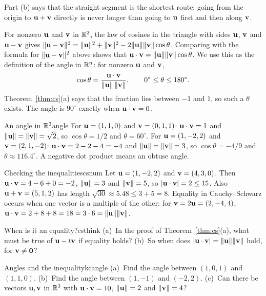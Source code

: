 \documentclass[11pt]{article}
\begin{document}
Part (b) says that the straight segment is the shortest route: going from the origin to $\mathbf{u}+\mathbf{v}$ directly is never longer than going to $\mathbf{u}$ first and then along $\mathbf{v}$.

For nonzero $\mathbf{u}$ and $\mathbf{v}$ in $\mathbb{R}^2$, the law of cosines in the triangle with sides $\mathbf{u}$, $\mathbf{v}$ and $\mathbf{u}-\mathbf{v}$ gives $\lVert\mathbf{u}-\mathbf{v}\rVert^2=\lVert\mathbf{u}\rVert^2+\lVert\mathbf{v}\rVert^2-2\lVert\mathbf{u}\rVert\lVert\mathbf{v}\rVert\cos\theta$. Comparing with the formula for $\lVert\mathbf{u}-\mathbf{v}\rVert^2$ above shows that $\mathbf{u}\cdot\mathbf{v}=\lVert\mathbf{u}\rVert\lVert\mathbf{v}\rVert\cos\theta$. We use this as the definition of the angle in $\mathbb{R}^n$: for nonzero $\mathbf{u}$ and $\mathbf{v}$,
\[
\cos\theta=\frac{\mathbf{u}\cdot\mathbf{v}}{\lVert\mathbf{u}\rVert\,\lVert\mathbf{v}\rVert},\qquad 0^\circ\le\theta\le180^\circ.
\]
Theorem~\ref{thm:cs}(a) says that the fraction lies between $-1$ and $1$, so such a $\theta$ exists. The angle is $90^\circ$ exactly when $\mathbf{u}\cdot\mathbf{v}=0$.

\begin{exmp}{An angle in $\mathbb{R}^3$}{angle}
For $\mathbf{u}=(1,1,0)$ and $\mathbf{v}=(0,1,1)$: $\mathbf{u}\cdot\mathbf{v}=1$ and $\lVert\mathbf{u}\rVert=\lVert\mathbf{v}\rVert=\sqrt2$, so $\cos\theta=1/2$ and $\theta=60^\circ$. For $\mathbf{u}=(1,-2,2)$ and $\mathbf{v}=(2,1,-2)$: $\mathbf{u}\cdot\mathbf{v}=2-2-4=-4$ and $\lVert\mathbf{u}\rVert=\lVert\mathbf{v}\rVert=3$, so $\cos\theta=-4/9$ and $\theta\approx116.4^\circ$. A negative dot product means an obtuse angle.
\end{exmp}

\begin{exmp}{Checking the inequalities}{csnum}
Let $\mathbf{u}=(1,-2,2)$ and $\mathbf{v}=(4,3,0)$. Then $\mathbf{u}\cdot\mathbf{v}=4-6+0=-2$, $\lVert\mathbf{u}\rVert=3$ and $\lVert\mathbf{v}\rVert=5$, so $|\mathbf{u}\cdot\mathbf{v}|=2\le15$. Also $\mathbf{u}+\mathbf{v}=(5,1,2)$ has length $\sqrt{30}\approx5.48\le3+5=8$. Equality in Cauchy--Schwarz occurs when one vector is a multiple of the other: for $\mathbf{v}=2\mathbf{u}=(2,-4,4)$, $\mathbf{u}\cdot\mathbf{v}=2+8+8=18=3\cdot6=\lVert\mathbf{u}\rVert\lVert\mathbf{v}\rVert$.
\end{exmp}

\begin{think}{When is it an equality?}{csthink}
(a)~In the proof of Theorem~\ref{thm:cs}(a), what must be true of $\mathbf{u}-t\mathbf{v}$ if equality holds? (b)~So when does $|\mathbf{u}\cdot\mathbf{v}|=\lVert\mathbf{u}\rVert\lVert\mathbf{v}\rVert$ hold, for $\mathbf{v}\neq\mathbf{0}$?
\end{think}

\begin{kc}{Angles and the inequality}{kcangle}
(a)~Find the angle between $(1,0,1)$ and $(1,1,0)$. (b)~Find the angle between $(1,-1)$ and $(-2,2)$. (c)~Can there be vectors $\mathbf{u},\mathbf{v}$ in $\mathbb{R}^3$ with $\mathbf{u}\cdot\mathbf{v}=10$, $\lVert\mathbf{u}\rVert=2$ and $\lVert\mathbf{v}\rVert=4$?
\end{kc}
\end{document}
